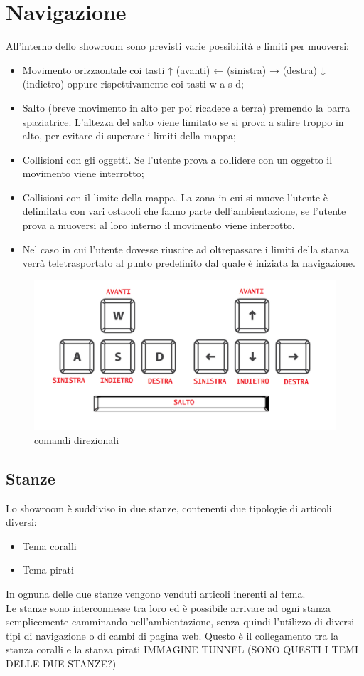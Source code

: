 \section{Navigazione}
All'interno dello showroom sono previsti varie possibilità e limiti per muoversi:
\begin{itemize}
	\item Movimento orizzaontale coi tasti ↑ (avanti) ← (sinistra) → (destra) ↓ (indietro) oppure rispettivamente coi tasti w a s d;
	\item Salto (breve movimento in alto per poi ricadere a terra) premendo la barra spaziatrice. L'altezza del salto viene limitato se si prova a salire troppo in alto, per evitare di superare i limiti della mappa;
	\item Collisioni con gli oggetti. Se l’utente prova a collidere con un oggetto il movimento viene interrotto;
	\item Collisioni con il limite della mappa. La zona in cui si muove l'utente è delimitata con vari ostacoli che fanno parte dell'ambientazione, se l'utente prova a muoversi al loro interno il movimento viene interrotto. 
	\item Nel caso in cui l'utente dovesse riuscire ad oltrepassare i limiti della stanza verrà teletrasportato al punto predefinito dal quale è iniziata la navigazione.
\end{itemize}
\begin{figure}[H]
  \renewcommand{\thefigure}{8}
  \includegraphics[width=\linewidth]{./res/images/comandi_direzionali.png}
  \caption{comandi direzionali}
  \label{comandi direzionali}
\end{figure}

\subsection{Stanze}
Lo showroom è suddiviso in due stanze, contenenti due tipologie di articoli diversi:
\begin{itemize}
	\item Tema coralli
	\item Tema pirati
\end{itemize}
In ognuna delle due stanze vengono venduti articoli inerenti al tema.\\
Le stanze sono interconnesse tra loro ed è possibile arrivare ad ogni stanza semplicemente camminando nell'ambientazione, senza quindi l'utilizzo di diversi tipi di navigazione o di cambi di pagina web.
Questo è il collegamento tra la stanza coralli e la stanza pirati
IMMAGINE TUNNEL (SONO QUESTI I TEMI DELLE DUE STANZE?)

\pagebreak


